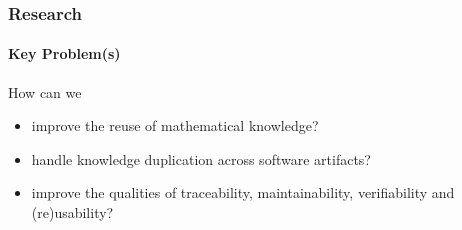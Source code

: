 \documentclass{beamer}
\begin{document}


%
%


\begin{frame}

\frametitle{Research}
\framesubtitle{Key Problem(s)}



How can we
	\begin{itemize}
	\item improve the reuse of mathematical knowledge?


	\item handle knowledge duplication across software artifacts?

	
	\item improve the qualities of
					traceability, maintainability, verifiability and (re)usability?
	\end{itemize}



\end{frame}
\end{document}
